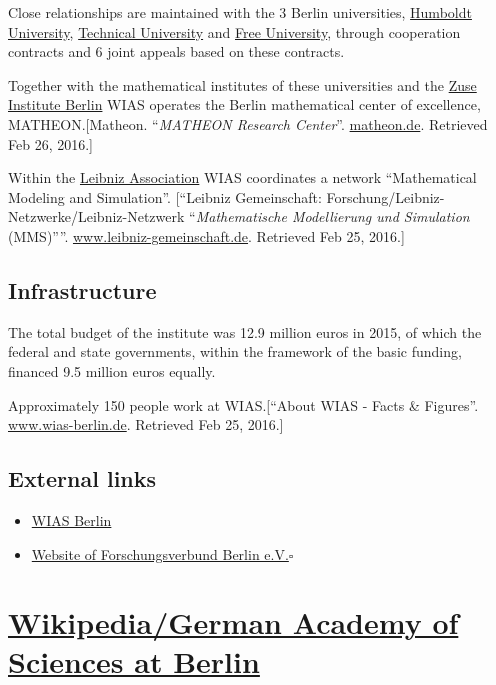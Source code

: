 \documentclass{book}
\numberwithin{equation}{section}
\begin{document}
%
Close relationships are maintained with the 3 Berlin universities, \href{https://en.wikipedia.org/wiki/Humboldt_University_of_Berlin}{Humboldt University}, \href{https://en.wikipedia.org/wiki/Technical_University_of_Berlin}{Technical University} and \href{https://en.wikipedia.org/wiki/Free_University_of_Berlin}{Free University}, through cooperation contracts and 6 joint appeals based on these contracts.

Together with the mathematical institutes of these universities and the \href{https://en.wikipedia.org/wiki/Zuse_Institute_Berlin}{Zuse Institute Berlin} WIAS operates the Berlin mathematical center of excellence, MATHEON.[Matheon. ``\textit{MATHEON Research Center}''. \url{matheon.de}. Retrieved Feb 26, 2016.]

%
Within the \href{https://en.wikipedia.org/wiki/Leibniz_Association}{Leibniz Association} WIAS coordinates a network ``Mathematical Modeling and Simulation''. [``Leibniz Gemeinschaft: Forschung/Leibniz-Netzwerke/Leibniz-Netzwerk ``\textit{Mathematische Modellierung und Simulation} (MMS)''''. \url{www.leibniz-gemeinschaft.de}. Retrieved Feb 25, 2016.]

\section{Infrastructure}
The total budget of the institute was 12.9 million euros in 2015, of which the federal and state governments, within the framework of the basic funding, financed 9.5 million euros equally. 

Approximately 150 people work at WIAS.[``About WIAS - Facts \& Figures''. \url{www.wias-berlin.de}. Retrieved Feb 25, 2016.]

\section{External links}
\begin{itemize}
    \item \href{http://www.wias-berlin.de/index.jsp?lang=1}{WIAS Berlin}
    \item \href{http://www.fv-berlin.de/}{Website of Forschungsverbund Berlin e.V.}\hfill$\square$
\end{itemize}


\chapter{\href{https://en.wikipedia.org/wiki/German_Academy_of_Sciences_at_Berlin}{Wikipedia/German Academy of Sciences at Berlin}}
\end{document}
